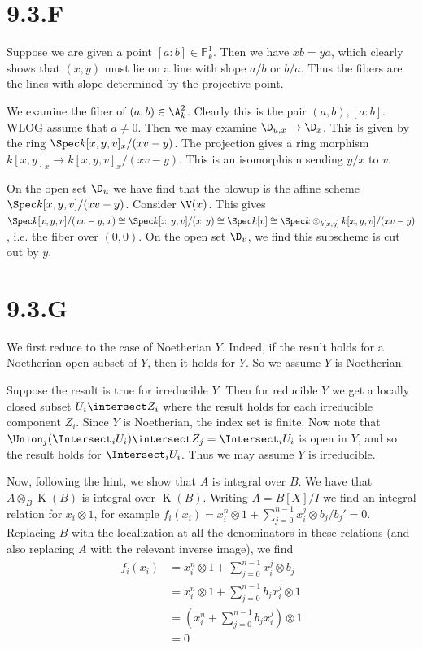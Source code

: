 \documentclass{article}
\begin{document}
\section{9.3.F}
Suppose we are given a point $[a : b] \in \mathbb{P}^1_k$. Then we have
$xb=ya$, which clearly shows that $(x, y)$ must
lie on a line with slope $a/b$ or $b/a$.
Thus the fibers are the lines with slope determined by the projective point.

We examine the fiber of $(a, b) \in \A^2_k$. Clearly this is the pair
$(a,b), [a : b]$. WLOG assume that $a \neq 0$. Then we may
examine $\D_{u, x} \to \D_x$. This is given by the ring
$\Spec k[x, y, v]_x/(xv-y)$. The projection gives a ring morphism
$k[x, y]_x \to k[x, y, v]_x/(xv-y)$. This is an isomorphism sending $y/x$
to $v$.

On the open set $\D_u$ we have find that the blowup is the
affine scheme $\Spec k[x, y, v]/(xv-y)$. Consider $\V(x)$. This
gives $\Spec k[x, y, v]/(xv-y,x) \cong \Spec
    k[x, y, v]/(x, y) \cong \Spec
    k[v] \cong \Spec k \otimes_{k[x, y]}
    k[x,y,v]/(xv-y)$, i.e. the fiber over $(0, 0)$. On
the open set $\D_v$, we find this subscheme is cut out by
$y$.

\section{9.3.G}
We first reduce to the case of Noetherian $Y$. Indeed, if
the result holds for a Noetherian open subset of $Y$, then
it holds for $Y$. So we assume $Y$ is
Noetherian.

Suppose the result is true for irreducible $Y$. Then for
reducible $Y$ we get a locally closed subset
$U_i \intersect Z_i$ where the result holds for each irreducible component
$Z_i$. Since $Y$ is Noetherian, the index
set is finite. Now note that $\Union_j (\Intersect_i U_i) \intersect Z_j = \Intersect_i U_i$ is open in
$Y$, and so the result holds for $\Intersect_i U_i$.
Thus we may assume $Y$ is irreducible.

Now, following the hint, we show that $A$ is integral over
$B$. We have that $A \otimes_B \operatorname{K}(B)$ is integral over
$\operatorname{K}(B)$. Writing $A=B[X]/I$ we find an integral
relation for $x_i \otimes 1$, for example $f_i(x_i)=x_i^n \otimes 1+\sum_{j=0}^{n-1} x_i^j \otimes b_j/b_j'=0$.
Replacing $B$ with the localization at all the denominators
in these relations (and also replacing $A$ with the
relevant inverse image), we find
\begin{align*}
    f_i(x_i) & =x_i^n \otimes 1+\sum_{j=0}^{n-1} x_i^j \otimes b_j  \\
             & =x_i^n \otimes 1+\sum_{j=0}^{n-1} b_jx_i^j \otimes 1 \\
             & = (x_i^n+\sum_{j=0}^{n-1} b_jx_i^j) \otimes 1        \\
             & =0
\end{align*}
\end{document}
